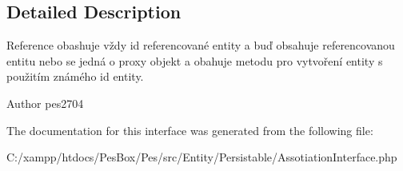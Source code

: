 \subsection{Detailed Description}
Reference obashuje vždy id referencované entity a buď obsahuje referencovanou entitu nebo se jedná o proxy objekt a obahuje metodu pro vytvoření entity s použitím známého id entity. \begin{DoxyAuthor}{Author}
pes2704 
\end{DoxyAuthor}


The documentation for this interface was generated from the following file\+:\begin{DoxyCompactItemize}
\item 
C\+:/xampp/htdocs/\+Pes\+Box/\+Pes/src/\+Entity/\+Persistable/Assotiation\+Interface.\+php\end{DoxyCompactItemize}
